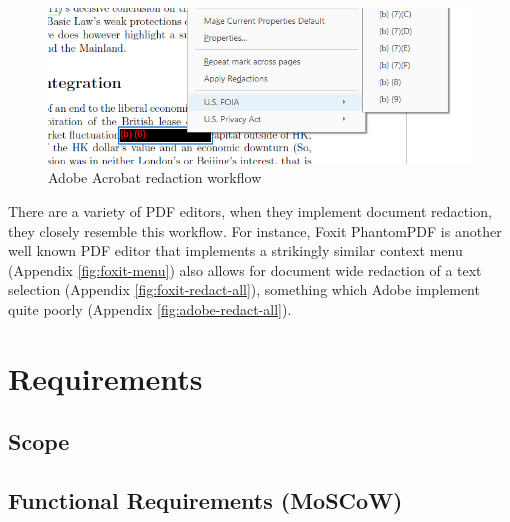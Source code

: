 \documentclass{l4proj}
\begin{document}
\begin{figure}
    \includegraphics[width=\linewidth]{images/adobe_redaction.png}
    \caption{Adobe Acrobat redaction workflow}
    \label{fig:adobe-redaction}
\end{figure}

There are a variety of PDF editors, when they implement document redaction, they closely resemble this workflow.
For instance, Foxit PhantomPDF is another well known PDF editor that implements a strikingly similar context menu (Appendix \ref{fig:foxit-menu}) also allows for document wide redaction of a text selection (Appendix \ref{fig:foxit-redact-all}), something which Adobe implement quite poorly (Appendix \ref{fig:adobe-redact-all}).

\chapter{Requirements}

\section{Scope}

\section{Functional Requirements (MoSCoW)}
\end{document}
